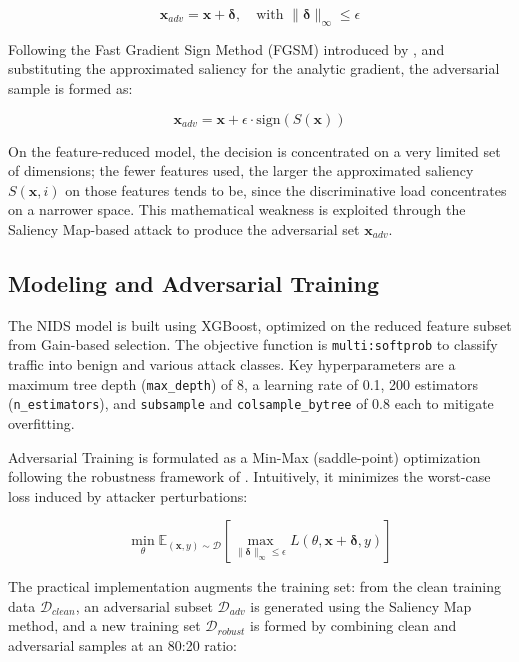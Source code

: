 \documentclass[11pt, a4paper]{article}
\begin{document}
\begin{equation}
\mathbf{x}_{adv} = \mathbf{x} + \boldsymbol{\delta}, \quad \text{with } \|\boldsymbol{\delta}\|_\infty \le \epsilon
\end{equation}

Following the Fast Gradient Sign Method (FGSM) introduced by \citet{ref_fgsm}, and substituting the approximated saliency for the analytic gradient, the adversarial sample is formed as:

\begin{equation}
\mathbf{x}_{adv} = \mathbf{x} + \epsilon \cdot \text{sign}\left( S(\mathbf{x}) \right)
\end{equation}

On the feature-reduced model, the decision is concentrated on a very limited set of dimensions; the fewer features used, the larger the approximated saliency $S(\mathbf{x}, i)$ on those features tends to be, since the discriminative load concentrates on a narrower space. This mathematical weakness is exploited through the Saliency Map-based attack to produce the adversarial set $\mathbf{x}_{adv}$.

\subsection{Modeling and Adversarial Training}
The NIDS model is built using XGBoost, optimized on the reduced feature subset from Gain-based selection. The objective function is \texttt{multi:softprob} to classify traffic into benign and various attack classes. Key hyperparameters are a maximum tree depth (\texttt{max\_depth}) of 8, a learning rate of 0.1, 200 estimators (\texttt{n\_estimators}), and \texttt{subsample} and \texttt{colsample\_bytree} of 0.8 each to mitigate overfitting.

Adversarial Training is formulated as a Min-Max (saddle-point) optimization following the robustness framework of \citet{ref_madry}. Intuitively, it minimizes the worst-case loss induced by attacker perturbations:

\begin{equation}
\min_{\theta} \mathbb{E}_{(\mathbf{x}, y) \sim \mathcal{D}} \left[ \max_{\|\boldsymbol{\delta}\|_\infty \le \epsilon} L(\theta, \mathbf{x} + \boldsymbol{\delta}, y) \right]
\end{equation}

The practical implementation augments the training set: from the clean training data $\mathcal{D}_{clean}$, an adversarial subset $\mathcal{D}_{adv}$ is generated using the Saliency Map method, and a new training set $\mathcal{D}_{robust}$ is formed by combining clean and adversarial samples at an 80:20 ratio:
\end{document}
